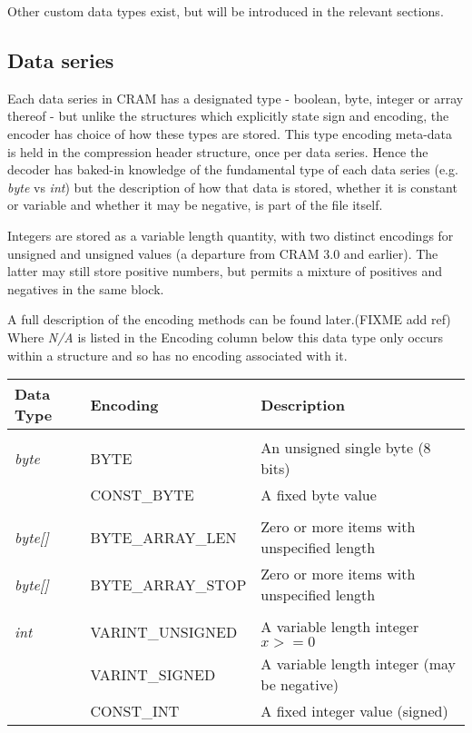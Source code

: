 \documentclass[a4paper]{article}
\begin{document}
Other custom data types exist, but will be introduced in the relevant sections.

\subsection*{Data series}

Each data series in CRAM has a designated type - boolean, byte, integer or array thereof - but unlike the structures which explicitly state sign and encoding, the encoder has choice of how these types are stored.
This type encoding meta-data is held in the compression header structure, once per data series.
Hence the decoder has baked-in knowledge of the fundamental type of each data series (e.g. \textit{byte} vs \textit{int}) but the description of how that data is stored, whether it is constant or variable and whether it may be negative, is part of the file itself.

Integers are stored as a variable length quantity, with two distinct encodings for unsigned and unsigned values (a departure from CRAM 3.0 and earlier).
The latter may still store positive numbers, but permits a mixture of positives and negatives in the same block.

A full description of the encoding methods can be found later.(FIXME add ref)
Where \textit{N/A} is listed in the Encoding column below this data type only occurs within a structure and so has no encoding associated with it.

\begin{tabular}{lll}
\textbf{Data Type}  & \textbf{Encoding} & \textbf{Description}\\
\hline
\\
\textit{byte}  & BYTE             & An unsigned single byte (8 bits)  \\
               & CONST\_BYTE      & A fixed byte value\\
\\
\textit{byte[]}& BYTE\_ARRAY\_LEN & Zero or more items with unspecified length\\
\textit{byte[]}& BYTE\_ARRAY\_STOP& Zero or more items with unspecified length\\
\\
\textit{int}   & VARINT\_UNSIGNED & A variable length integer $x >= 0$\\
               & VARINT\_SIGNED   & A variable length integer (may be negative)\\
               & CONST\_INT       & A fixed integer value (signed)\\
\end{tabular}
\end{document}
